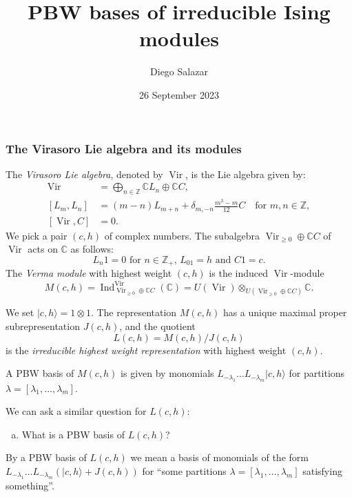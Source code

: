 \documentclass{beamer}
\title{PBW bases of irreducible Ising modules}
\author{Diego Salazar}
\institute[IMPA]
{
  Instituto de Matemática Pura e Aplicada (IMPA) \\
  Rio de Janeiro -- Brasil \\ [1cm]
}
\date[26 September 2023]{26 September 2023}
\DeclareMathOperator{\Vir}{Vir}
\DeclareMathOperator{\Ind}{Ind}
\begin{document}
\maketitle

\begin{frame}
  \frametitle{The Virasoro Lie algebra and its modules}

  The \emph{Virasoro Lie algebra}, denoted by $\Vir$, is the Lie algebra given by:
  \begin{align*}
    \Vir &= \bigoplus_{n \in \mathbb{Z}}\mathbb{C}L_n \oplus \mathbb{C}C, \\
    [L_m, L_n] &= (m - n)L_{m + n} + \delta_{m, -n}\frac{m^3 - m}{12}C \quad \text{for $m, n \in \mathbb{Z}$}, \\
    [\Vir, C] &= 0.
  \end{align*}
  We pick a pair $(c, h)$ of complex numbers.
  The subalgebra $\Vir_{\ge 0} \oplus \mathbb{C}C$ of $\Vir$ acts on $\mathbb{C}$ as follows:
  \begin{equation*}
    \text{$L_n1 = 0$ for $n \in \mathbb{Z}_+$, $L_01 = h$ and $C1 = c$}.
  \end{equation*}
  The \emph{Verma module} with highest weight $(c, h)$ is the induced $\Vir$-module
  \begin{equation*}
    M(c, h) = \Ind^{\Vir}_{\Vir_{\ge 0} \oplus \mathbb{C}C}(\mathbb{C}) = U(\Vir) \otimes_{U(\Vir_{\ge 0} \oplus \mathbb{C}C)} \mathbb{C}.
  \end{equation*}

\end{frame}

\begin{frame}

  We set $|c, h\rangle = 1\otimes1$.
  The representation $M(c, h)$ has a unique maximal proper subrepresentation $J(c, h)$, and the quotient
  \begin{equation*}
    L(c, h) = M(c, h)/J(c, h)
  \end{equation*}
  is the \emph{irreducible highest weight representation} with highest weight $(c, h)$.

  \begin{theorem}
    \label{thr:1}
    A PBW basis of $M(c, h)$ is given by monomials $L_{-\lambda_1}\dots L_{-\lambda_m}|c, h\rangle$ for partitions $\lambda = [\lambda_1, \dots, \lambda_m]$.
  \end{theorem}

  We can ask a similar question for $L(c, h)$:
  \begin{enumerate}[(a)]
  \item What is a PBW basis of $L(c, h)$?
  \end{enumerate}
  By a PBW basis of $L(c, h)$ we mean a basis of monomials of the form $L_{-\lambda_1}\dots L_{-\lambda_m}(|c, h\rangle + J(c, h))$ for ``some partitions $\lambda = [\lambda_1, \dots, \lambda_m]$ satisfying something''.
\end{frame}
\end{document}
